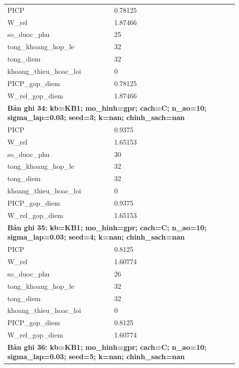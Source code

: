 \begin{longtable}{p{0.43\linewidth}p{0.50\linewidth}}
PICP & 0.78125 \\
W\_\allowbreak rel & 1.87466 \\
so\_\allowbreak duoc\_\allowbreak phu & 25 \\
tong\_\allowbreak khoang\_\allowbreak hop\_\allowbreak le & 32 \\
tong\_\allowbreak diem & 32 \\
khoang\_\allowbreak thieu\_\allowbreak hoac\_\allowbreak loi & 0 \\
PICP\_\allowbreak gop\_\allowbreak diem & 0.78125 \\
W\_\allowbreak rel\_\allowbreak gop\_\allowbreak diem & 1.87466 \\
\midrule
\multicolumn{2}{p{0.95\linewidth}}{\textbf{Bản ghi 34: kb=KB1; mo\_hinh=gpr; cach=C; n\_ao=10; sigma\_lap=0.03; seed=3; k=nan; chinh\_sach=nan}} \\
PICP & 0.9375 \\
W\_\allowbreak rel & 1.65153 \\
so\_\allowbreak duoc\_\allowbreak phu & 30 \\
tong\_\allowbreak khoang\_\allowbreak hop\_\allowbreak le & 32 \\
tong\_\allowbreak diem & 32 \\
khoang\_\allowbreak thieu\_\allowbreak hoac\_\allowbreak loi & 0 \\
PICP\_\allowbreak gop\_\allowbreak diem & 0.9375 \\
W\_\allowbreak rel\_\allowbreak gop\_\allowbreak diem & 1.65153 \\
\midrule
\multicolumn{2}{p{0.95\linewidth}}{\textbf{Bản ghi 35: kb=KB1; mo\_hinh=gpr; cach=C; n\_ao=10; sigma\_lap=0.03; seed=4; k=nan; chinh\_sach=nan}} \\
PICP & 0.8125 \\
W\_\allowbreak rel & 1.60774 \\
so\_\allowbreak duoc\_\allowbreak phu & 26 \\
tong\_\allowbreak khoang\_\allowbreak hop\_\allowbreak le & 32 \\
tong\_\allowbreak diem & 32 \\
khoang\_\allowbreak thieu\_\allowbreak hoac\_\allowbreak loi & 0 \\
PICP\_\allowbreak gop\_\allowbreak diem & 0.8125 \\
W\_\allowbreak rel\_\allowbreak gop\_\allowbreak diem & 1.60774 \\
\midrule
\multicolumn{2}{p{0.95\linewidth}}{\textbf{Bản ghi 36: kb=KB1; mo\_hinh=gpr; cach=C; n\_ao=10; sigma\_lap=0.03; seed=5; k=nan; chinh\_sach=nan}} \\

\end{longtable}

